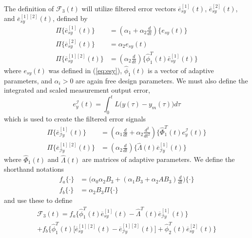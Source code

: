 \documentclass[english]{ifacconf}
\begin{document}
The definition of $\mathcal{F}_3(t)$ will utilize filtered error vectors $\overline{e}_{sy}^{[1]}(t)$, $\overline{e}_{sy}^{[2]}(t)$, and $\overline{e}_{sy}^{[1][2]}(t)$, defined by
\begin{equation}
\begin{aligned} 
	\Pi \big \{ \overline{e}_{sy}^{[1]}(t) \big \} & = (\alpha_1 + \alpha_2 \frac{d}{dt}) \big \{ e_{sy}(t) \big \} \\
	\Pi \big \{ \overline{e}_{sy}^{[2]}(t) \big \} & = \alpha_2 e_{sy}(t) \\
	\Pi \big \{ \overline{e}_{sy}^{[1][2]}(t) \big \} & = (\alpha_2 \frac{d}{dt}) \big \{ \hat{\phi}_1^T(t) \bar{e}_{sy}^{[1]}(t) \big \}
\end{aligned}	
\end{equation}
where $e_{sy}(t)$ was defined in (\ref{eq:esy}), $\hat{\phi}_1(t)$ is a vector of adaptive parameters, and $\alpha_i > 0$ are again free design parameters. We must also define the integrated and scaled measurement output error, 
\begin{equation}
e_{y}^{\mathcal{I}}(t) = \int_0^{t} L\big (y(\tau) - y_m(\tau)\big) d\tau
\end{equation}
which is used to create the filtered error signals
\begin{equation}
\begin{aligned}
	\Pi \big \{  \overline{e}_{\mathcal{I}y}^{[1]} (t) \big \} &= (\alpha_1 \frac{d}{dt} + \alpha_2 \frac{d^2}{dt^2}) \big \{ \hat{\Phi}_1^T (t) e_{y}^{\mathcal{I}}(t) \big \} \\
	\Pi \big \{  \overline{e}_{\mathcal{I}y}^{[1][2]} (t) \big \} &= (\alpha_2 \frac{d}{dt}) \big \{ \hat{\Lambda}(t) \overline{e}_{\mathcal{I}y}^{[1]} (t) \big \}
\end{aligned}	
\end{equation}
where $\hat{\Phi}_1(t)$ and $\hat{\Lambda}(t)$ are matrices of adaptive parameters. We define the shorthand notations
\begin{equation}
\begin{aligned}
	f_a \{ \cdot \} &= \big(\alpha_0 \alpha_2 B_3 + (\alpha_1 B_3 + \alpha_2 A B_3)\frac{d}{dt} \big) \{ \cdot \} \\
	f_b \{ \cdot \} &= \alpha_2 B_3 \Pi \{ \cdot \}
\end{aligned}
\end{equation}
and use these to define
\begin{multline}
	\mathcal{F}_3(t) = f_a \big \{ \hat{\phi}_1^T(t) \overline{e}_{sy}^{[1]}(t) - \hat{\Lambda}^T(t) \overline{e}_{\mathcal{I}y}^{[1]} (t) \big \} \\
	+ f_b \big \{ \hat{\phi}_1^T(t) \big[\overline{e}_{sy}^{[1][2]}(t) -  \overline{e}_{\mathcal{I}y}^{[1][2]} (t) \big ] + \hat{\phi}_2^T (t) \overline{e}_{sy}^{[2]}(t) \big \}
\end{multline}
\end{document}
